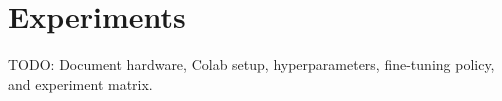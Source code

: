 \section{Experiments}

TODO: Document hardware, Colab setup, hyperparameters, fine-tuning policy, and experiment matrix.
